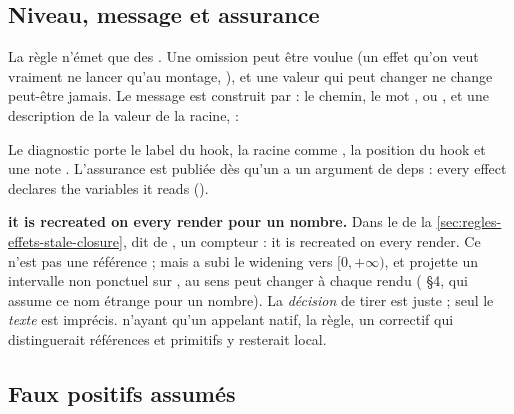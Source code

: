 \subsection{Niveau, message et assurance}

La règle n'émet que des \Warning{}. Une omission peut être voulue (un effet qu'on veut vraiment ne lancer qu'au montage, ), et une valeur qui \og peut changer\fg{} ne change peut-être jamais. Le message est construit par  : le chemin, le mot ,  ou , et une description de la valeur de la racine,  :


Le diagnostic porte le label du hook, la racine comme , la position du hook et une note . L'assurance est publiée dès qu'un  a un argument de deps : \og every effect declares the variables it reads\fg{} ().

\begin{piege}
\textbf{\og it is recreated on every render\fg{} pour un nombre.} Dans le  de la \cref{sec:regles-effets-stale-closure},  dit de , un compteur : \og it is recreated on every render\fg{}. Ce n'est pas une référence ; mais  a subi le widening vers $[0, +\infty)$, et  projette un intervalle non ponctuel sur , au sens \og peut changer à chaque rendu\fg{} ( §4, qui assume ce nom étrange pour un nombre). La \emph{décision} de tirer est juste ; seul le \emph{texte} est imprécis.  n'ayant qu'un appelant natif, la règle, un correctif qui distinguerait références et primitifs y resterait local.
\end{piege}

\subsection{Faux positifs assumés}

